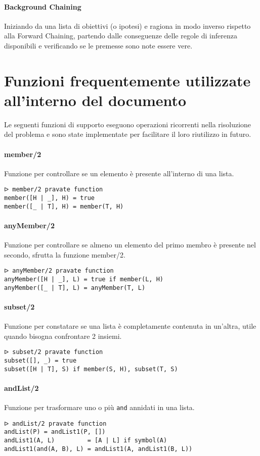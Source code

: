 \documentclass[12pt,twoside]{report}
\begin{document}
\paragraph{Background Chaining} Iniziando da una lista di obiettivi (o ipotesi) e ragiona in modo inverso rispetto alla Forward Chaining, partendo dalle conseguenze delle regole di inferenza disponibili e verificando se le premesse sono note essere vere.

\section*{Funzioni frequentemente utilizzate all'interno del documento}

Le seguenti funzioni di supporto eseguono operazioni ricorrenti nella risoluzione del problema e sono state implementate per facilitare il loro riutilizzo in futuro.
\paragraph{member/2}
Funzione per controllare se un elemento è presente all'interno di una lista.
\begin{lstlisting}
ᐅ member/2 pravate function 
member([H | _], H) = true
member([_ | T], H) = member(T, H)
\end{lstlisting}

\paragraph{anyMember/2}
Funzione per controllare se almeno un elemento del primo membro è presente nel secondo, sfrutta la funzione member/2.
\begin{lstlisting}
ᐅ anyMember/2 pravate function
anyMember([H | _], L) = true if member(L, H)
anyMember([_ | T], L) = anyMember(T, L)
\end{lstlisting}

\paragraph{subset/2}
Funzione per constatare se una lista è completamente contenuta in un'altra, utile quando bisogna confrontare 2 insiemi.
\begin{lstlisting}
ᐅ subset/2 pravate function
subset([], _) = true
subset([H | T], S) if member(S, H), subset(T, S)
\end{lstlisting}

\paragraph{andList/2}
Funzione per trasformare uno o più \texttt{and} annidati in una lista.
\begin{lstlisting}
ᐅ andList/2 pravate function
andList(P) = andList1(P, [])
andList1(A, L)         = [A | L] if symbol(A)
andList1(and(A, B), L) = andList1(A, andList1(B, L))
\end{lstlisting}
\end{document}

